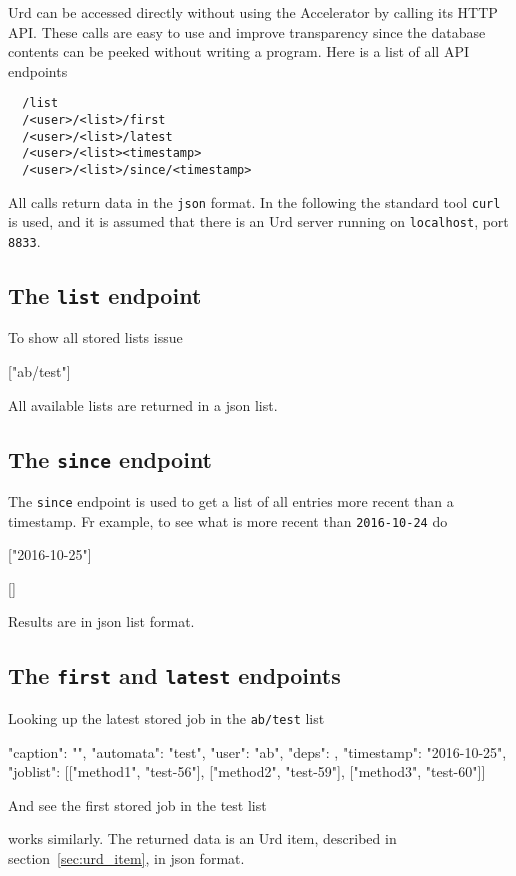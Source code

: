 Urd can be accessed directly without using the Accelerator by calling
its HTTP API.  These calls are easy to use and improve transparency
since the database contents can be peeked without writing a program.
Here is a list of all API endpoints
\begin{verbatim}
  /list
  /<user>/<list>/first
  /<user>/<list>/latest
  /<user>/<list><timestamp>
  /<user>/<list>/since/<timestamp>
\end{verbatim}
All calls return data in the \texttt{json} format.  In the following
the standard tool \texttt{curl} is used, and it is assumed that there
is an Urd server running on \texttt{localhost}, port \texttt{8833}.


\subsection{The \texttt{list} endpoint}
To show all stored lists issue
\begin{shell}
["ab/test"]
\end{shell}
All available lists are returned in a json list.



\subsection{The \texttt{since} endpoint}
The \texttt{since} endpoint is used to get a list of all entries more recent than a timestamp.
Fr example, to see what is more recent than \texttt{2016-10-24} do
\begin{shell}
["2016-10-25"]
\end{shell}
\begin{shell}
[]
\end{shell}
Results are in json list format.


\subsection{The \texttt{first} and \texttt{latest} endpoints}
Looking up the latest stored job in the \texttt{ab/test} list
\begin{shell}
{"caption": "", "automata": "test", "user": "ab", "deps": {},
  "timestamp": "2016-10-25", "joblist": [["method1", "test-56"],
  ["method2", "test-59"], ["method3", "test-60"]]}
\end{shell}
And see the first stored job in the test list
\begin{shell}
\end{shell}
works similarly.  The returned data is an Urd item, described in
section~\ref{sec:urd_item}, in json format.



